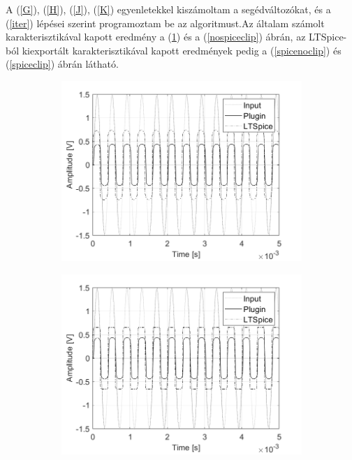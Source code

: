 A (\ref{G}), (\ref{H}), (\ref{J}), (\ref{K}) egyenletekkel kiszámoltam a segédváltozókat, és a (\ref{iter}) lépései szerint programoztam be az algoritmust.Az általam számolt karakterisztikával kapott eredmény a (\ref{nospicenoclip}) és a (\ref{nospiceclip}) ábrán, az LTSpice-ból kiexportált karakterisztikával kapott eredmények pedig a (\ref{spicenoclip}) és (\ref{spiceclip}) ábrán látható.
\begin{figure}[H]
    \centering
    \begin{subfigure}{0.47\textwidth}
        \centering
        \includegraphics[scale=0.38]{figures/nospicenoclip.png}
        \caption{}
        \label{nospicenoclip}
    \end{subfigure}
    \hfill
    \begin{subfigure}{0.47\textwidth}
        \centering
        \includegraphics[scale=0.38]{figures/nospiceclip.png}

\end{subfigure}
\end{figure}
